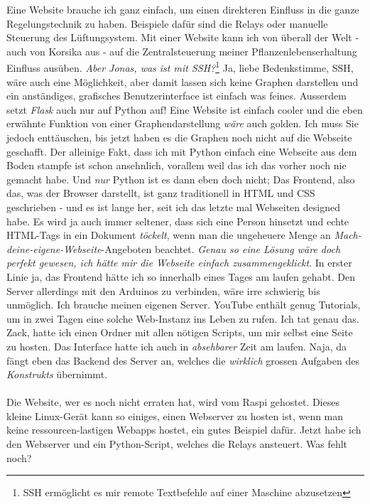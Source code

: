 \documentclass[12pt,titlepage,a4paper]{article}
\begin{document}
Eine Website brauche ich ganz einfach, um einen direkteren Einfluss in die ganze Regelungstechnik zu haben. Beispiele dafür sind die Relays oder manuelle Steuerung des Lüftungsystem. Mit einer Website kann ich von überall der Welt - auch von Korsika aus - auf die Zentralsteuerung meiner Pflanzenlebenserhaltung Einfluss ausüben. \textit{Aber Jonas, was ist mit SSH?}\footnote{SSH ermöglicht es mir remote Textbefehle auf einer Maschine abzusetzen} Ja, liebe Bedenkstimme, SSH, wäre auch eine Möglichkeit, aber damit lassen sich keine Graphen darstellen und ein anständiges, grafisches Benutzerinterface ist einfach was feines. Ausserdem setzt \textit{Flask} auch nur auf Python auf! Eine Website ist einfach cooler und die eben erwähnte Funktion von einer Graphendarstellung \textit{wäre} auch golden. Ich muss Sie jedoch enttäuschen, bis jetzt haben es die Graphen noch nicht auf die Webseite geschafft. Der alleinige Fakt, dass ich mit Python einfach eine Webseite aus dem Boden stampfe ist schon ansehnlich, vorallem weil das ich das vorher noch nie gemacht habe. Und \textit{nur} Python ist es dann eben doch nicht; Das Frontend, also das, was der Browser darstellt, ist ganz traditionell in HTML und CSS geschrieben - und es ist lange her, seit ich das letzte mal Webseiten designed habe. Es wird ja auch immer seltener, dass sich eine Person hinsetzt und echte HTML-Tags in ein Dokument \textit{töckelt}, wenn man die ungeheuere Menge an \textit{Mach-deine-eigene-Webseite}-Angeboten beachtet. \textit{Genau so eine Lösung wäre doch perfekt gewesen, ich hätte mir die Webseite einfach zusammengeklickt}. In erster Linie ja, das Frontend hätte ich so innerhalb eines Tages am laufen gehabt. Den Server allerdings mit den Arduinos zu verbinden, wäre irre schwierig bis unmöglich. Ich brauche meinen eigenen Server. YouTube enthält genug Tutorials, um in zwei Tagen eine solche Web-Instanz ins Leben zu rufen. Ich tat genau das. Zack, hatte ich einen Ordner mit allen nötigen Scripts, um mir selbst eine Seite zu hosten. Das Interface hatte ich auch in \textit{absehbarer} Zeit am laufen. Naja, da fängt eben das Backend des Server an, welches die \textit{wirklich} grossen Aufgaben des \textit{Konstrukts} übernimmt.\\\\
Die Website, wer es noch nicht erraten hat, wird vom Raspi gehostet. Dieses kleine Linux-Gerät kann so einiges, einen Webserver zu hosten ist, wenn man keine ressourcen-lastigen Webapps hostet, ein gutes Beispiel dafür. Jetzt habe ich den Webserver und ein Python-Script, welches die Relays ansteuert. Was fehlt noch? \\
\end{document}
